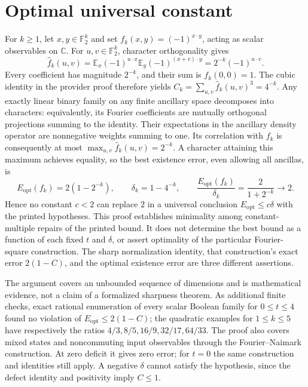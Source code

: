 \documentclass[11pt]{article}
\begin{document}
\section{Optimal universal constant}

For $k\geq1$, let $x,y\in\mathbb F_2^k$ and set
$f_k(x,y)=(-1)^{x\cdot y}$, acting as scalar observables on $\mathbb C$.
For $u,v\in\mathbb F_2^k$, character orthogonality gives
\[
 \widehat f_k(u,v)
 =\mathbb E_x(-1)^{u\cdot x}
       \mathbb E_y(-1)^{(x+v)\cdot y}
 =2^{-k}(-1)^{u\cdot v}.
\]
Every coefficient has magnitude $2^{-k}$, and their sum is $f_k(0,0)=1$.
The cubic identity in the provider proof therefore yields
$C_k=\sum_{u,v}\widehat f_k(u,v)^3=4^{-k}$.
Any exactly linear binary family on any finite ancillary space decomposes
into characters: equivalently, its Fourier coefficients are mutually
orthogonal projections summing to the identity. Their expectations in the
ancillary density operator are nonnegative weights summing to one. Its
correlation with $f_k$ is consequently at most
$\max_{u,v}\widehat f_k(u,v)=2^{-k}$. A character attaining this maximum
achieves equality, so the best existence error, even allowing all ancillas, is
\[
 E_{\mathrm{opt}}(f_k)=2(1-2^{-k}),\qquad
 \delta_k=1-4^{-k},\qquad
 \frac{E_{\mathrm{opt}}(f_k)}{\delta_k}
   =\frac{2}{1+2^{-k}}\longrightarrow2.
\]
Hence no constant $c<2$ can replace $2$ in a universal conclusion
$E_{\mathrm{opt}}\leq c\delta$ with the printed hypotheses. This proof
establishes minimality among constant-multiple repairs of the printed bound.
It does not determine the best bound as a function of each fixed $t$ and
$\delta$, or assert optimality of the particular Fourier-square construction.
The sharp normalization identity, that construction's exact error $2(1-C)$,
and the optimal existence error are three different assertions.

The argument covers an unbounded sequence of dimensions and is mathematical
evidence, not a claim of a formalized sharpness theorem. As additional finite
checks, exact rational enumeration of every scalar Boolean family for
$0\leq t\leq4$ found no violation of $E_{\mathrm{opt}}\leq2(1-C)$;
the quadratic examples for $1\leq k\leq5$ have respectively the ratios
$4/3,8/5,16/9,32/17,64/33$. The proof also covers mixed states and
noncommuting input observables through the Fourier--Naimark construction.
At zero deficit it gives zero error; for $t=0$ the same construction and
identities still apply. A negative $\delta$ cannot satisfy the hypothesis,
since the defect identity and positivity imply $C\leq1$.
\end{document}
